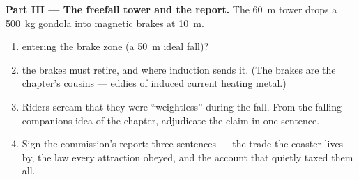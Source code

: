 \begin{problem}
\medskip\noindent\textbf{Part III --- The freefall tower
and the report.}
The \qty{60}{m} tower drops a \qty{500}{kg} gondola into
magnetic brakes at \qty{10}{m}.
\begin{enumerate}[resume]
  \item {} entering the brake zone (a \qty{50}{m} ideal
        fall)?
  \item {} the brakes must retire, and where induction
        sends it. (The brakes are the  chapter's
        cousins --- eddies of induced current heating
        metal.)
  \item Riders scream that they were ``weightless'' during
        the fall. From the falling-companions idea of the
         chapter, adjudicate the claim in one
        sentence.
  \item Sign the commission's report: three sentences ---
        the trade the coaster lives by, the law every
        attraction obeyed, and the account that quietly
        taxed them all.
\end{enumerate}
\end{problem}
